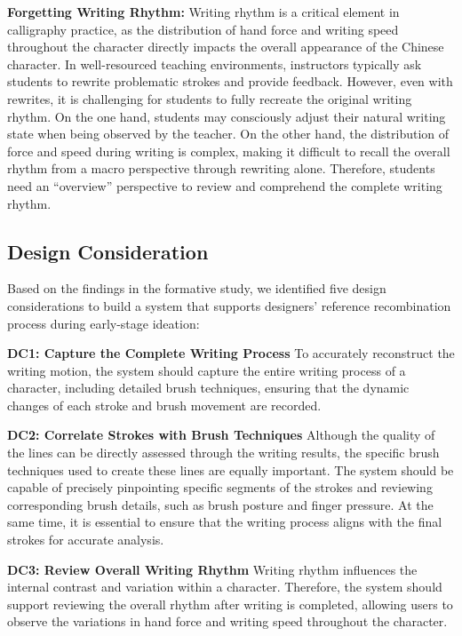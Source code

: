 \textbf{Forgetting Writing Rhythm:} Writing rhythm is a critical element in calligraphy practice, as the distribution of hand force and writing speed throughout the character directly impacts the overall appearance of the Chinese character\cite{wang2024standards, kraus1991brushes}. In well-resourced teaching environments, instructors typically ask students to rewrite problematic strokes and provide feedback. However, even with rewrites, it is challenging for students to fully recreate the original writing rhythm. On the one hand, students may consciously adjust their natural writing state when being observed by the teacher. On the other hand, the distribution of force and speed during writing is complex, making it difficult to recall the overall rhythm from a macro perspective through rewriting alone. Therefore, students need an ``overview'' perspective to review and comprehend the complete writing rhythm.

\subsection{Design Consideration}
Based on the findings in the formative study, we identified five design considerations to build a system that supports designers' reference recombination process during early-stage ideation: 

\textbf{DC1: Capture the Complete Writing Process} 
To accurately reconstruct the writing motion, the system should capture the entire writing process of a character, including detailed brush techniques, ensuring that the dynamic changes of each stroke and brush movement are recorded.

\textbf{DC2: Correlate Strokes with Brush Techniques}
Although the quality of the lines can be directly assessed through the writing results, the specific brush techniques used to create these lines are equally important. The system should be capable of precisely pinpointing specific segments of the strokes and reviewing corresponding brush details, such as brush posture and finger pressure. At the same time, it is essential to ensure that the writing process aligns with the final strokes for accurate analysis.

\textbf{DC3: Review Overall Writing Rhythm}
Writing rhythm influences the internal contrast and variation within a character. Therefore, the system should support reviewing the overall rhythm after writing is completed, allowing users to observe the variations in hand force and writing speed throughout the character.

